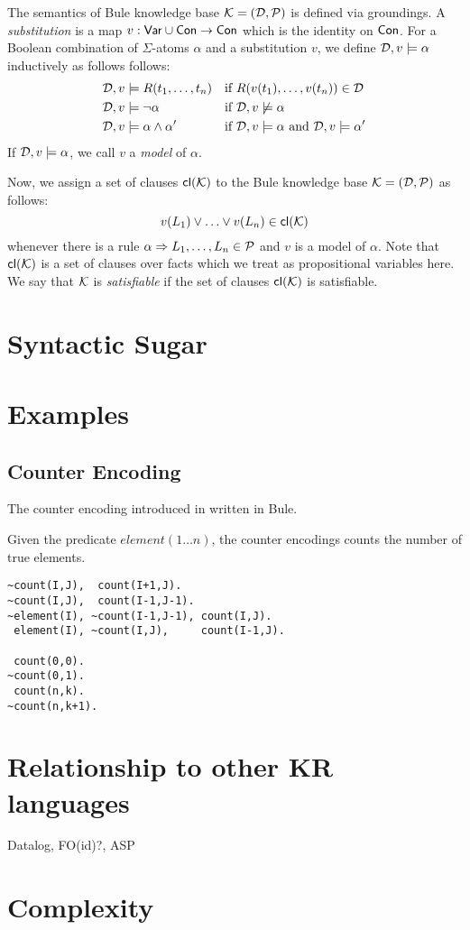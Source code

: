 \documentclass{new_tlp}
\begin{document}
The semantics of Bule knowledge base $\mathcal{K}=(\mathcal{D},\mathcal{P})$ is defined via groundings. 
A \emph{substitution} is a map $v:\mathsf{Var}\cup\mathsf{Con}\to\mathsf{Con}$ which is the identity on $\mathsf{Con}$. 
For a Boolean combination of $\Sigma$-atoms $\alpha$ and a substitution $v$, we define $\mathcal{D},v\models \alpha$ inductively as follows follows: 
%
\begin{align*}
  \mathcal{D},v & \models R(t_1,\ldots,t_n) && \text{if
  $R(v(t_1),\ldots,v(t_n))\in \mathcal{D}$} \\
  \mathcal{D}, v& \models \neg \alpha && \text{if $\mathcal{D},v\not\models \alpha$}
  \\
  \mathcal{D}, v& \models \alpha \wedge \alpha' && \text{if $\mathcal{D},v\models
  \alpha$ and $\mathcal{D},v\models\alpha'$}
\end{align*}
%
If $\mathcal{D},v\models\alpha$, we call $v$ a \emph{model} of $\alpha$.

Now, we assign a set of clauses $\mathsf{cl}(\mathcal{K})$ to the Bule knowledge
base $\mathcal{K}=(\mathcal{D},\mathcal{P})$ as follows:
%
\[v(L_1)\vee\ldots\vee v(L_n)\in \mathsf{cl}(\mathcal{K})\]
%
whenever there is a rule $\alpha \Rightarrow L_1,\ldots,L_n\in\mathcal{P}$ and $v$ is a model of $\alpha$. 
Note that $\mathsf{cl}(\mathcal{K})$ is a set of clauses over facts which we treat as propositional variables here.  
We say that $\mathcal{K}$ is \emph{satisfiable} if the set of clauses $\mathsf{cl}(\mathcal{K})$ is satisfiable. 

\section{Syntactic Sugar}

\section{Examples}

\subsection{Counter Encoding}

The counter encoding introduced in \cite{sinz2005} written in Bule. 

Given the predicate $element(1\ldots n)$, 
the counter encodings counts the number of true elements.

\begin{lstlisting}
~count(I,J),  count(I+1,J).
~count(I,J),  count(I-1,J-1).
~element(I), ~count(I-1,J-1), count(I,J).
 element(I), ~count(I,J),     count(I-1,J).

 count(0,0).
~count(0,1).
 count(n,k).
~count(n,k+1).
\end{lstlisting}

\section{Relationship to other KR languages}

Datalog, FO(id)?, ASP

\section{Complexity}



\end{document}
